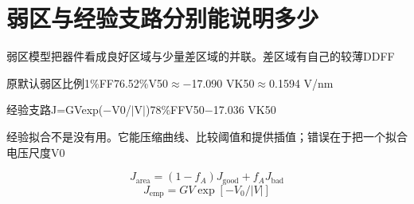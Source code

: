 \section{{\cjkfont 弱区与经验支路分别能说明多少}\allowbreak{}}\label{sec:36}
{\cjkfont 弱区模型把器件看成良好区域与少量差区域的并联。差区域有自己的较薄}\allowbreak{}DD\allowbreak{}FF\allowbreak{}
\par
{\cjkfont 原默认弱区比例}\allowbreak{}1\%\allowbreak{}FF\allowbreak{}76.52\%\allowbreak{}V50\ensuremath{\approx}\allowbreak{}−17.090 V\allowbreak{}K50\ensuremath{\approx}\allowbreak{}0.1594 V/nm\allowbreak{}
\par
{\cjkfont 经验支路}\allowbreak{}J=\allowbreak{}GVexp(−V0/\ensuremath{\vert}V\ensuremath{\vert})\allowbreak{}78\%FF\allowbreak{}V50\allowbreak{}−17.036 V\allowbreak{}K50\allowbreak{}
\par
{\cjkfont 经验拟合不是没有用。它能压缩曲线、比较阈值和提供插值；错误在于把一个拟合电压尺度}\allowbreak{}V0\allowbreak{}
\par
\begin{equation}
J_{\mathrm{area}}=(1-f_A)J_{\mathrm{good}}+f_AJ_{\mathrm{bad}}
\label{eq:41}\end{equation}
\begin{equation}
J_{\mathrm{emp}}=GV\exp[-V_0/|V|]
\label{eq:42}\end{equation}
